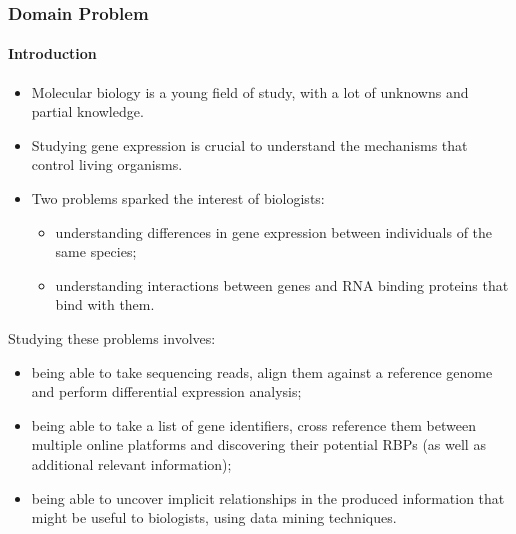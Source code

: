 \documentclass[xcolor=dvipsnames]{beamer}
\begin{document}
\begin{frame}[allowframebreaks]
  \frametitle{Domain Problem}
  \framesubtitle{Introduction}

\begin{itemize}
\item
Molecular biology is a young field of study, with a lot of unknowns and partial
knowledge.\\ \vspace{0.8cm}

\item
Studying gene expression is crucial to understand the mechanisms that control
living organisms.\\ \vspace{0.8cm}

\item
Two problems sparked the interest of biologists:

\begin{itemize}
\item
understanding differences in gene expression between individuals of the same
species;

\item
understanding interactions between genes and RNA binding proteins that bind with
them.
\end{itemize}
\end{itemize}

\framebreak

Studying these problems involves:

\begin{itemize}
\item
being able to take sequencing reads, align them against a reference genome and
perform differential expression analysis;\\ \vspace{0.4cm}

\item
being able to take a list of gene identifiers, cross reference them between
multiple online platforms and discovering their potential RBPs (as well as
additional relevant information);\\ \vspace{0.4cm}

\item
being able to uncover implicit relationships in the produced information that
might be useful to biologists, using data mining techniques.
\end{itemize}



\end{frame}
\end{document}
